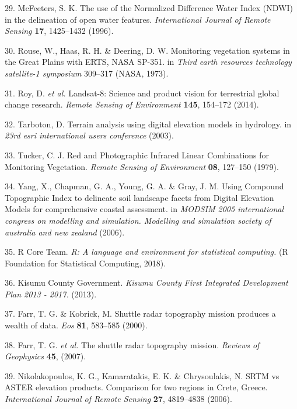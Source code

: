 \documentclass[12pt,oneside]{article}
\begin{document}
\leavevmode\hypertarget{ref-McFeeters_1996}{}%
29. McFeeters, S. K. The use of the Normalized Difference Water Index
(NDWI) in the delineation of open water features. \emph{International
Journal of Remote Sensing} \textbf{17}, 1425--1432 (1996).

\leavevmode\hypertarget{ref-Rouse_et_al_1973}{}%
30. Rouse, W., Haas, R. H. \& Deering, D. W. Monitoring vegetation
systems in the Great Plains with ERTS, NASA SP-351. in \emph{Third earth
resources technology satellite-1 symposium} 309--317 (NASA, 1973).

\leavevmode\hypertarget{ref-Roy_et_al_2014}{}%
31. Roy, D. \emph{et al.} Landsat-8: Science and product vision for
terrestrial global change research. \emph{Remote Sensing of Environment}
\textbf{145}, 154--172 (2014).

\leavevmode\hypertarget{ref-Tarboton_2003}{}%
32. Tarboton, D. Terrain analysis using digital elevation models in
hydrology. in \emph{23rd esri international users conference} (2003).

\leavevmode\hypertarget{ref-Tucker_1979}{}%
33. Tucker, C. J. Red and Photographic Infrared Linear Combinations for
Monitoring Vegetation. \emph{Remote Sensing of Environment} \textbf{08},
127--150 (1979).

\leavevmode\hypertarget{ref-Yang_et_al_2006}{}%
34. Yang, X., Chapman, G. A., Young, G. A. \& Gray, J. M. Using Compound
Topographic Index to delineate soil landscape facets from Digital
Elevation Models for comprehensive coastal assessment. in \emph{MODSIM
2005 international congress on modelling and simulation. Modelling and
simulation society of australia and new zealand} (2006).

\leavevmode\hypertarget{ref-RCoreTeam_2018}{}%
35. R Core Team. \emph{R: A language and environment for statistical
computing.} (R Foundation for Statistical Computing, 2018).

\leavevmode\hypertarget{ref-KisumuCountyGovernment_2013}{}%
36. Kisumu County Government. \emph{Kisumu County First Integrated
Development Plan 2013 - 2017.} (2013).

\leavevmode\hypertarget{ref-Farr_et_al_2000}{}%
37. Farr, T. G. \& Kobrick, M. Shuttle radar topography mission produces
a wealth of data. \emph{Eos} \textbf{81}, 583--585 (2000).

\leavevmode\hypertarget{ref-Farr_et_al_2007}{}%
38. Farr, T. G. \emph{et al.} The shuttle radar topography mission.
\emph{Reviews of Geophysics} \textbf{45}, (2007).

\leavevmode\hypertarget{ref-Nikolakopoulos_et_al_2006}{}%
39. Nikolakopoulos, K. G., Kamaratakis, E. K. \& Chrysoulakis, N. SRTM
vs ASTER elevation products. Comparison for two regions in Crete,
Greece. \emph{International Journal of Remote Sensing} \textbf{27},
4819--4838 (2006).
\end{document}
